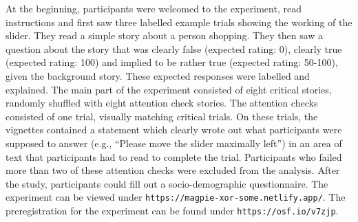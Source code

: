 \documentclass{sp}
\begin{document}
At the beginning, participants were welcomed to the experiment, read instructions and first saw three labelled example trials showing the working of the slider. They read a simple story about a person shopping. They then saw a question about the story that was clearly false (expected rating: 0), clearly true (expected rating: 100) and implied to be rather true (expected rating: 50-100), given the background story. These expected responses were labelled and explained.  
The main part of the experiment consisted of eight critical stories, randomly shuffled with eight attention check stories. The attention checks consisted of one trial, visually matching critical trials. On these trials, the vignettes contained a statement which clearly wrote out what participants were supposed to answer (e.g., ``Please move the slider maximally left'') in an area of text that participants had to read to complete the trial. Participants who failed more than two of these attention checks were excluded from the analysis. 
After the study, participants could fill out a socio-demographic questionnaire.
The experiment can be viewed under \texttt{https://magpie-xor-some.netlify.app/}. The preregistration for the experiment can be found under \texttt{https://osf.io/v7zjp}.
\end{document}
